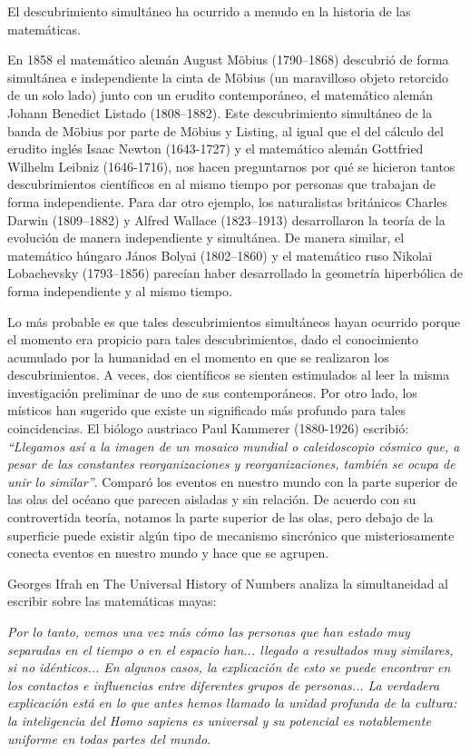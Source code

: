 \documentclass{article}
\begin{document}
El descubrimiento simult\'aneo ha ocurrido a menudo en la historia de las
matem\'aticas.

En 1858 el matem\'atico alem\'an August Möbius (1790–1868) descubri\'o de forma
simult\'anea e independiente la cinta de Möbius (un maravilloso objeto retorcido
de un solo lado) junto con un erudito contempor\'aneo, el matem\'atico alem\'an
Johann Benedict Listado (1808–1882). Este descubrimiento simult\'aneo de la
banda de Möbius por parte de Möbius y Listing, al igual que el del c\'alculo del
erudito ingl\'es Isaac Newton (1643-1727) y el matem\'atico alem\'an Gottfried
Wilhelm Leibniz (1646-1716), nos hacen preguntarnos por qu\'e se hicieron tantos
descubrimientos cient\'ificos en al mismo tiempo por personas que trabajan de
forma independiente. Para dar otro ejemplo, los naturalistas brit\'anicos
Charles Darwin (1809–1882) y Alfred Wallace (1823–1913) desarrollaron la
teor\'ia de la evoluci\'on de manera independiente y simult\'anea. De manera
similar, el matem\'atico h\'ungaro J\'anos Bolyai (1802–1860) y el matem\'atico
ruso Nikolai Lobachevsky (1793–1856) parec\'ian haber desarrollado la
geometr\'ia hiperb\'olica de forma independiente y al mismo tiempo.

Lo m\'as probable es que tales descubrimientos simult\'aneos hayan ocurrido porque
el momento era propicio para tales descubrimientos, dado el conocimiento
acumulado por la humanidad en el momento en que se realizaron los
descubrimientos. A veces, dos cient\'ificos se sienten estimulados al leer la
misma investigaci\'on preliminar de uno de sus contempor\'aneos. Por otro lado, los
m\'isticos han sugerido que existe un significado m\'as profundo para tales
coincidencias. El bi\'ologo austriaco Paul Kammerer (1880-1926) escribi\'o:
\textit{“Llegamos as\'i a la imagen de un mosaico mundial o caleidoscopio c\'osmico que, a
pesar de las constantes reorganizaciones y reorganizaciones, tambi\'en se ocupa de
unir lo similar”}. Compar\'o los eventos en nuestro mundo con la parte superior de
las olas del oc\'eano que parecen aisladas y sin relaci\'on. De acuerdo con su
controvertida teor\'ia, notamos la parte superior de las olas, pero debajo de la
superficie puede existir alg\'un tipo de mecanismo sincr\'onico que misteriosamente
conecta eventos en nuestro mundo y hace que se agrupen.

Georges Ifrah en The Universal History of Numbers analiza la simultaneidad al
escribir sobre las matem\'aticas mayas:

\textit{Por lo tanto, vemos una vez m\'as c\'omo las personas que han estado muy separadas
en el tiempo o en el espacio han... llegado a resultados muy similares, si no
id\'enticos... En algunos casos, la explicaci\'on de esto se puede encontrar en los
contactos e influencias entre diferentes grupos de personas... La verdadera
explicaci\'on est\'a en lo que antes hemos llamado la unidad profunda de la cultura:
la inteligencia del Homo sapiens es universal y su potencial es notablemente
uniforme en todas partes del mundo.}
\end{document}
